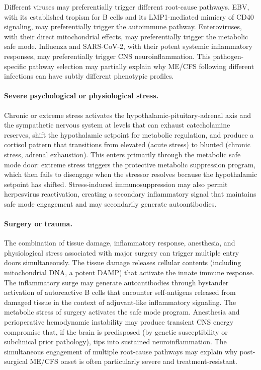 Different viruses may preferentially trigger different root-cause pathways. EBV, with its established tropism for B cells and its LMP1-mediated mimicry of CD40 signaling, may preferentially trigger the autoimmune pathway. Enteroviruses, with their direct mitochondrial effects, may preferentially trigger the metabolic safe mode. Influenza and SARS-CoV-2, with their potent systemic inflammatory responses, may preferentially trigger CNS neuroinflammation. This pathogen-specific pathway selection may partially explain why ME/CFS following different infections can have subtly different phenotypic profiles.

\paragraph{Severe psychological or physiological stress.} Chronic or extreme stress activates the hypothalamic-pituitary-adrenal axis and the sympathetic nervous system at levels that can exhaust catecholamine reserves, shift the hypothalamic setpoint for metabolic regulation, and produce a cortisol pattern that transitions from elevated (acute stress) to blunted (chronic stress, adrenal exhaustion). This enters primarily through the metabolic safe mode door: extreme stress triggers the protective metabolic suppression program, which then fails to disengage when the stressor resolves because the hypothalamic setpoint has shifted. Stress-induced immunosuppression may also permit herpesvirus reactivation, creating a secondary inflammatory signal that maintains safe mode engagement and may secondarily generate autoantibodies.

\paragraph{Surgery or trauma.} The combination of tissue damage, inflammatory response, anesthesia, and physiological stress associated with major surgery can trigger multiple entry doors simultaneously. The tissue damage releases cellular contents (including mitochondrial DNA, a potent DAMP) that activate the innate immune response. The inflammatory surge may generate autoantibodies through bystander activation of autoreactive B cells that encounter self-antigens released from damaged tissue in the context of adjuvant-like inflammatory signaling. The metabolic stress of surgery activates the safe mode program. Anesthesia and perioperative hemodynamic instability may produce transient CNS energy compromise that, if the brain is predisposed (by genetic susceptibility or subclinical prior pathology), tips into sustained neuroinflammation. The simultaneous engagement of multiple root-cause pathways may explain why post-surgical ME/CFS onset is often particularly severe and treatment-resistant.

